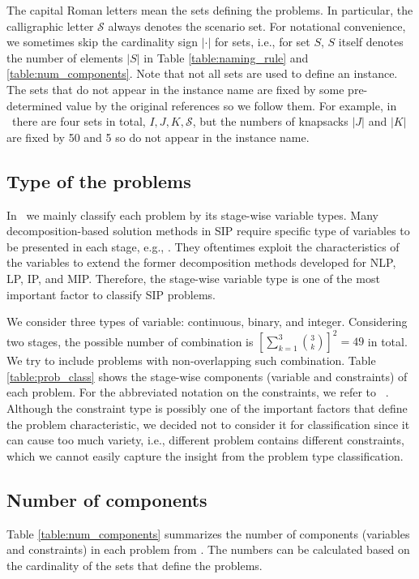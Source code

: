 The capital Roman letters mean the sets defining the problems. In particular, the calligraphic letter $\mathcal{S}$ always denotes the scenario set. For notational convenience, we sometimes skip the cardinality sign $|\cdot|$ for sets, i.e., for set $S$, $S$ itself denotes the number of elements $|S|$ in Table \ref{table:naming_rule} and \ref{table:num_components}. Note that not all sets are used to define an instance. The sets that do not appear in the instance name are fixed by some pre-determined value by the original references so we follow them. For example, in \smkp\ there are four sets in total, $I,J,K,\mathcal{S}$, but the numbers of knapsacks $|J|$ and $|K|$ are fixed by 50 and 5 so do not appear in the instance name.


\subsection{Type of the problems}
In \siplibtwo\, we mainly classify each problem by its stage-wise variable types. Many decomposition-based solution methods in SIP require specific type of variables to be presented in each stage, e.g., \cite{LL1993,SSV1998,CT1998,CS1999,SF2002}. They oftentimes exploit the characteristics of the variables to extend the former decomposition methods developed for NLP, LP, IP, and MIP. Therefore, the stage-wise variable type is one of the most important factor to classify SIP problems.

We consider three types of variable: continuous, binary, and integer. Considering two stages, the possible number of combination is $\left[\sum_{k=1}^3\binom{3}{k}\right]^2=49$ in total. We try to include problems with non-overlapping such combination. Table \ref{table:prob_class} shows the stage-wise components (variable and constraints) of each problem. For the abbreviated notation on the constraints, we refer to \miplib\ \cite{MIPLIB}. Although the constraint type is possibly one of the important factors that define the problem characteristic, we decided not to consider it for classification since it can cause too much variety, i.e., different problem contains different constraints, which we cannot easily capture the insight from the problem type classification. 


\subsection{Number of components}
Table \ref{table:num_components} summarizes the number of components (variables and constraints) in each problem from \siplibtwo. The numbers can be calculated based on the cardinality of the sets that define the problems.

